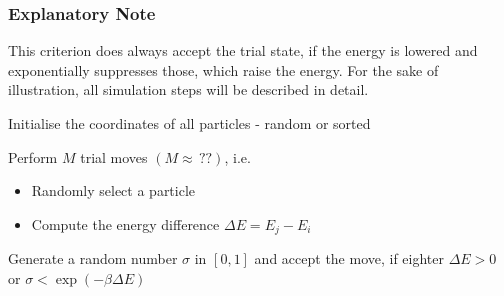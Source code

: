 \subsubsection{Explanatory Note}
This criterion does always accept the trial state, if the energy is lowered and exponentially suppresses those, which raise the energy.
For the sake of illustration, all simulation steps will be described in detail.
\begin{enumerate}
	\item{Initialise the coordinates of all particles - random or sorted}
	\item{Perform $M$ trial moves $(M \approx\,??)$, i.e.
		\begin{itemize}
			\item{Randomly select a particle}
			\item{Compute the energy difference $\Delta E = E_j - E_i$}
		\end{itemize}
	\item{Generate a random number $\sigma$ in $[0, 1]$ and accept the move, if eighter $\Delta E>0$ or $\sigma < \exp(-\beta\Delta E)$}
}
\end{enumerate}
